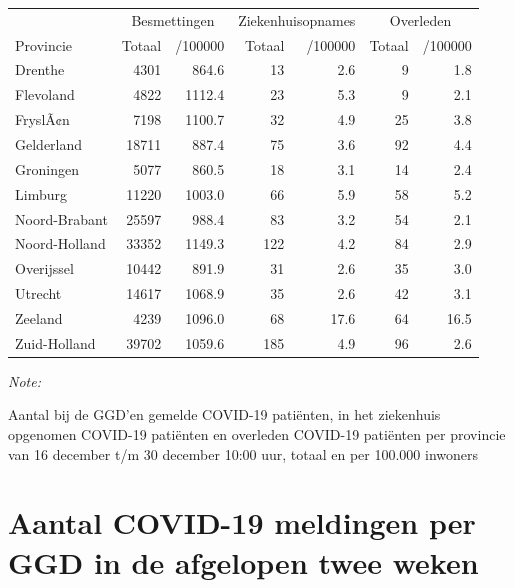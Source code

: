 \documentclass[
  english,
  man,floatsintext]{apa6}
\begin{document}
\begin{table}
\centering
\begin{threeparttable}
\begin{tabular}{lrrrrrr}
\toprule
\multicolumn{1}{c}{ } & \multicolumn{2}{c}{Besmettingen} & \multicolumn{2}{c}{Ziekenhuisopnames} & \multicolumn{2}{c}{Overleden} \\
\cmidrule(l{3pt}r{3pt}){2-3} \cmidrule(l{3pt}r{3pt}){4-5} \cmidrule(l{3pt}r{3pt}){6-7}
Provincie & Totaal & /100000 & Totaal & /100000 & Totaal & /100000\\
\midrule
Drenthe & 4301 & 864.6 & 13 & 2.6 & 9 & 1.8\\
Flevoland & 4822 & 1112.4 & 23 & 5.3 & 9 & 2.1\\
FryslÃ¢n & 7198 & 1100.7 & 32 & 4.9 & 25 & 3.8\\
Gelderland & 18711 & 887.4 & 75 & 3.6 & 92 & 4.4\\
Groningen & 5077 & 860.5 & 18 & 3.1 & 14 & 2.4\\
Limburg & 11220 & 1003.0 & 66 & 5.9 & 58 & 5.2\\
Noord-Brabant & 25597 & 988.4 & 83 & 3.2 & 54 & 2.1\\
Noord-Holland & 33352 & 1149.3 & 122 & 4.2 & 84 & 2.9\\
Overijssel & 10442 & 891.9 & 31 & 2.6 & 35 & 3.0\\
Utrecht & 14617 & 1068.9 & 35 & 2.6 & 42 & 3.1\\
Zeeland & 4239 & 1096.0 & 68 & 17.6 & 64 & 16.5\\
Zuid-Holland & 39702 & 1059.6 & 185 & 4.9 & 96 & 2.6\\
\bottomrule
\end{tabular}
\begin{tablenotes}
\item \textit{Note: } 
\item Aantal bij de GGD’en gemelde COVID-19 patiënten, in het ziekenhuis opgenomen COVID-19 patiënten en overleden COVID-19 patiënten per provincie van 16 december t/m 30 december 10:00 uur, totaal en per 100.000 inwoners
\end{tablenotes}
\end{threeparttable}
\end{table}

\newpage

\hypertarget{aantal-covid-19-meldingen-per-ggd-in-de-afgelopen-twee-weken}{%
\section{Aantal COVID-19 meldingen per GGD in de afgelopen twee weken}\label{aantal-covid-19-meldingen-per-ggd-in-de-afgelopen-twee-weken}}
\end{document}
